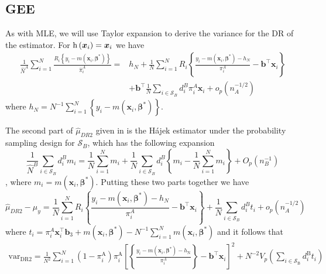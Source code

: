\documentclass[
  letterpaper,
  DIV=11,
  numbers=noendperiod]{scrreprt}
\begin{document}
\hypertarget{gee-1}{%
\subsection{GEE}\label{gee-1}}

As with MLE, we will use Taylor expansion to derive the variance for the
DR of the estimator. For \(\operatorname{h}\left(\boldsymbol{x}_i\right) = \boldsymbol{x}_i\)
we have \[
\begin{aligned}
\frac{1}{\hat{N}^A} \sum_{i=1}^N \frac{R_i\left\{y_i-m\left(\boldsymbol{x}_i, \boldsymbol{\beta}^*\right)\right\}}{\hat{\pi}_i^A}= & h_N+\frac{1}{N} \sum_{i=1}^N R_i\left\{\frac{y_i-m\left(\boldsymbol{x}_i, \boldsymbol{\beta}^*\right)-h_N}{\pi_i^A}-\mathbf{b}^{\top} \boldsymbol{x}_i\right\} \\
& +\mathbf{b}^{\top} \frac{1}{N} \sum_{i \in \mathcal{S}_B} d_i^B \pi_i^A \boldsymbol{x}_i+o_p\left(n_A^{-1 / 2}\right)
\end{aligned}
\] where
\(h_N=N^{-1} \sum_{i=1}^N\left\{y_i-m\left(\boldsymbol{x}_i, \boldsymbol{\beta}^*\right)\right\}\).

The second part of \(\hat{\mu}_{D R 2}\) given in is the Hájek estimator
under the probability sampling design for \(\mathcal{S}_B\), which has
the following expansion \[
\frac{1}{\hat{N}^B} \sum_{i \in \mathcal{S}_B} d_i^B m_i=\frac{1}{N} \sum_{i=1}^N m_i+\frac{1}{N} \sum_{i \in \mathcal{S}_B} d_i^B\left\{m_i-\frac{1}{N} \sum_{i=1}^N m_i\right\}+O_p\left(n_B^{-1}\right)
\], where \(m_i=m\left(\boldsymbol{x}_i, \boldsymbol{\beta}^*\right)\).
Putting these two parts together we have \[
\hat{\mu}_{D R 2}-\mu_y=\frac{1}{N} \sum_{i=1}^N R_i\left\{\frac{y_i-m\left(\boldsymbol{x}_i, \boldsymbol{\beta}^*\right)-h_N}{\pi_i^A}-\mathbf{b}^{\top} \boldsymbol{x}_i\right\}+\frac{1}{N} \sum_{i \in \mathcal{S}_B} d_i^B t_i+o_p\left(n_A^{-1 / 2}\right)
\] where
\(t_i=\pi_i^A \boldsymbol{x}_i^{\top} \mathbf{b}_3+m\left(\boldsymbol{x}_i, \boldsymbol{\beta}^*\right)-N^{-1} \sum_{i=1}^N m\left(\boldsymbol{x}_i, \boldsymbol{\beta}^*\right)\)
and it follows that \[
\begin{gathered}
\text{var}_{\mathrm{DR} 2}=\frac{1}{N^2} \sum_{i=1}^N\left(1-\pi_i^{\mathrm{A}}\right) \pi_i^{\mathrm{A}}\left[\left\{\frac{y_i-m\left(\boldsymbol{x}_i, \boldsymbol{\beta}^*\right)-h_{\mathrm{N}}}{\pi_i^A}\right\} -
\mathbf{b}^{\top} \boldsymbol{x}_i\right]^2 + N^{-2} V_p\left(\sum_{i \in \mathcal{S}_{\mathrm{B}}} d_i^{\mathrm{B}} t_i\right)
\end{gathered}
\]
\end{document}
